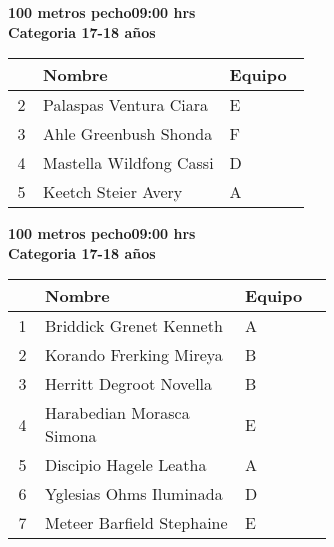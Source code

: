 \begin{minipage}{0.95\linewidth}\vspace{0.5cm} 
\begin{flushleft}
\textbf{
\hspace{-0.15cm}100 metros pecho\hspace{1.5cm}09:00 hrs \\Categoria 17-18 años}\vspace{-0.2cm} 
\end{flushleft}
\begin{tabular}{cp{0.63\linewidth}l}
\hline
& \textbf{Nombre} & \textbf{Equipo} \\ \hline
2 & Palaspas Ventura Ciara & E \\ 
3 & Ahle Greenbush Shonda & F \\ 
4 & Mastella Wildfong Cassi & D \\ 
5 & Keetch Steier Avery & A \\ 
\end{tabular}
\end{minipage}
\begin{minipage}{0.95\linewidth}\vspace{0.5cm} 
\begin{flushleft}
\textbf{
\hspace{-0.15cm}100 metros pecho\hspace{1.5cm}09:00 hrs \\Categoria 17-18 años}\vspace{-0.2cm} 
\end{flushleft}
\begin{tabular}{cp{0.63\linewidth}l}
\hline
& \textbf{Nombre} & \textbf{Equipo} \\ \hline
1 & Briddick Grenet Kenneth & A \\ 
2 & Korando Frerking Mireya & B \\ 
3 & Herritt Degroot Novella & B \\ 
4 & Harabedian Morasca Simona & E \\ 
5 & Discipio Hagele Leatha & A \\ 
6 & Yglesias Ohms Iluminada & D \\ 
7 & Meteer Barfield Stephaine & E \\ 
\end{tabular}
\end{minipage}
